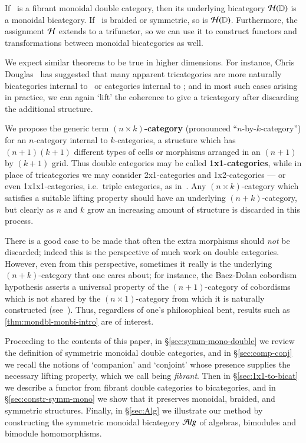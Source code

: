 \documentclass{amsart}
\begin{document}
\begin{thm}\label{thm:mondbl-monbi-intro}
  If \lD\ is a fibrant monoidal double category, then its underlying
  bicategory $\mathcal{H}(\mathbb{D})$ is a monoidal bicategory.  If \lD\ is braided
  or symmetric, so is $\mathcal{H}(\mathbb{D})$. Furthermore, the assignment $\mathcal{H}$
  extends to a trifunctor, so we can use it to construct functors and
  transformations between monoidal bicategories as well.
\end{thm}

We expect similar theorems to be true in higher dimensions.  For
instance, Chris Douglas~\cite{douglas:tfttalk} has suggested that many
apparent tricategories are more naturally bicategories internal to
\cCat\ or categories internal to \cTwocat; and in most such cases
arising in practice, we can again `lift' the coherence to give a
tricategory after discarding the additional structure.

We propose the generic term \textbf{$(n\times k)$-category}
(pronounced ``$n$-by-$k$-category'') for an $n$-category internal to
$k$-categories, a structure which has $(n+1)(k+1)$ different types of
cells or morphisms arranged in an $(n+1)$ by $(k+1)$ grid.  Thus
double categories may be called \textbf{1x1-categories}, while in
place of tricategories we may consider 2x1-categories and
1x2-categories --- or even 1x1x1-categories, i.e.\ triple categories,
as in~\cite{gp:intercategories-i,gp:intercategories-ii}.  Any
$(n\times k)$-category which satisfies a suitable lifting property
should have an underlying $(n+k)$-category, but clearly as $n$ and $k$
grow an increasing amount of structure is discarded in this process.


There is a good case to be made that often the extra morphisms should
\emph{not} be discarded; indeed this is the perspective of much work
on double categories.  However, even from this perspective, sometimes
it really is the underlying $(n+k)$-category that one cares about; for
instance, the Baez-Dolan cobordism hypothesis asserts a universal
property of the $(n+1)$-category of cobordisms which is not shared by
the $(n\times 1)$-category from which it is naturally constructed
(see~\cite{lurie:tft}).  Thus, regardless of one's philosophical bent,
results such as \autoref{thm:mondbl-monbi-intro} are of interest.

Proceeding to the contents of this paper, in
\S\ref{sec:symm-mono-double} we review the definition of symmetric
monoidal double categories, and in \S\ref{sec:comp-conj} we recall the
notions of `companion' and `conjoint' whose presence supplies the
necessary lifting property, which we call being \emph{fibrant}.  Then
in \S\ref{sec:1x1-to-bicat} we describe a functor from fibrant double
categories to bicategories, and in \S\ref{sec:constr-symm-mono} we
show that it preserves monoidal, braided, and symmetric structures. Finally, in \S\ref{sec:Alg} we illustrate our method by constructing the symmetric monoidal bicategory ${\mathcal{A}}lg$ of algebras, bimodules and bimodule homomorphisms.
\end{document}
